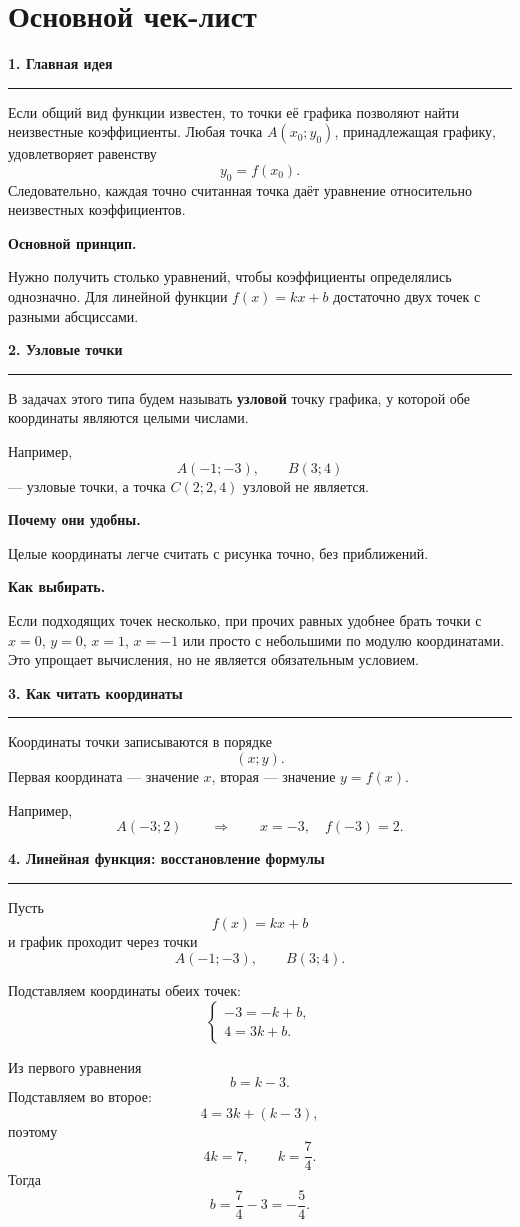 \documentclass[a4paper,12pt]{article}
\newcommand{\topic}[1]{%
  \Needspace{8\baselineskip}%
  \par\vspace{0.8em}
  {\large\bfseries\color{darkaccent}#1}\par
  \vspace{0.2em}
  {\color{accent}\rule{\linewidth}{0.6pt}}\par
  \vspace{0.25em}
}
\newcommand{\keyidea}[1]{%
  \par\smallskip
  {\bfseries\color{darkaccent}#1}\enspace
}
\begin{document}
\section*{\color{darkaccent}Основной чек-лист}

\topic{1. Главная идея}

Если общий вид функции известен, то точки её графика позволяют найти неизвестные коэффициенты. Любая точка \(A(x_0;y_0)\), принадлежащая графику, удовлетворяет равенству
\[
y_0=f(x_0).
\]
Следовательно, каждая точно считанная точка даёт уравнение относительно неизвестных коэффициентов.

\keyidea{Основной принцип.}
Нужно получить столько уравнений, чтобы коэффициенты определялись однозначно. Для линейной функции \(f(x)=kx+b\) достаточно двух точек с разными абсциссами.

\topic{2. Узловые точки}

В задачах этого типа будем называть \textbf{узловой} точку графика, у которой обе координаты являются целыми числами.

Например,
\[
A(-1;-3),\qquad B(3;4)
\]
--- узловые точки, а точка \(C(2;2{,}4)\) узловой не является.

\keyidea{Почему они удобны.}
Целые координаты легче считать с рисунка точно, без приближений.

\keyidea{Как выбирать.}
Если подходящих точек несколько, при прочих равных удобнее брать точки с \(x=0\), \(y=0\), \(x=1\), \(x=-1\) или просто с небольшими по модулю координатами. Это упрощает вычисления, но не является обязательным условием.

\topic{3. Как читать координаты}

Координаты точки записываются в порядке
\[
(x;y).
\]
Первая координата --- значение \(x\), вторая --- значение \(y=f(x)\).

Например,
\[
A(-3;2)
\qquad\Longrightarrow\qquad
x=-3,\quad f(-3)=2.
\]

\topic{4. Линейная функция: восстановление формулы}

Пусть
\[
f(x)=kx+b
\]
и график проходит через точки
\[
A(-1;-3),\qquad B(3;4).
\]

Подставляем координаты обеих точек:
\[
\begin{cases}
-3=-k+b,\\
4=3k+b.
\end{cases}
\]

Из первого уравнения
\[
b=k-3.
\]
Подставляем во второе:
\[
4=3k+(k-3),
\]
поэтому
\[
4k=7,\qquad k=\frac74.
\]
Тогда
\[
b=\frac74-3=-\frac54.
\]
\end{document}
